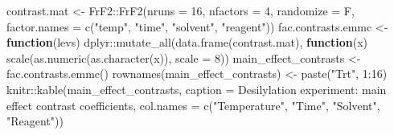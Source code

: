 \documentclass[
]{book}
\newenvironment{Shaded}{\begin{snugshade}}{\end{snugshade}}
\newcommand{\AttributeTok}[1]{\textcolor[rgb]{0.77,0.63,0.00}{#1}}
\newcommand{\ControlFlowTok}[1]{\textcolor[rgb]{0.13,0.29,0.53}{\textbf{#1}}}
\newcommand{\DecValTok}[1]{\textcolor[rgb]{0.00,0.00,0.81}{#1}}
\newcommand{\FunctionTok}[1]{\textcolor[rgb]{0.00,0.00,0.00}{#1}}
\newcommand{\NormalTok}[1]{#1}
\newcommand{\OtherTok}[1]{\textcolor[rgb]{0.56,0.35,0.01}{#1}}
\newcommand{\SpecialCharTok}[1]{\textcolor[rgb]{0.00,0.00,0.00}{#1}}
\newcommand{\StringTok}[1]{\textcolor[rgb]{0.31,0.60,0.02}{#1}}
\theoremstyle{definition}
\theoremstyle{definition}
\theoremstyle{definition}
\theoremstyle{definition}
\theoremstyle{remark}
\begin{document}
\begin{Shaded}
\begin{Highlighting}[]
\NormalTok{contrast.mat }\OtherTok{\textless{}{-}}\NormalTok{ FrF2}\SpecialCharTok{::}\FunctionTok{FrF2}\NormalTok{(}\AttributeTok{nruns =} \DecValTok{16}\NormalTok{, }\AttributeTok{nfactors =} \DecValTok{4}\NormalTok{, }\AttributeTok{randomize =}\NormalTok{ F, }
                           \AttributeTok{factor.names =} \FunctionTok{c}\NormalTok{(}\StringTok{"temp"}\NormalTok{, }\StringTok{"time"}\NormalTok{, }\StringTok{"solvent"}\NormalTok{, }\StringTok{"reagent"}\NormalTok{))}
\NormalTok{fac.contrasts.emmc }\OtherTok{\textless{}{-}} \ControlFlowTok{function}\NormalTok{(levs) }
\NormalTok{  dplyr}\SpecialCharTok{::}\FunctionTok{mutate\_all}\NormalTok{(}\FunctionTok{data.frame}\NormalTok{(contrast.mat), }\ControlFlowTok{function}\NormalTok{(x) }\FunctionTok{scale}\NormalTok{(}\FunctionTok{as.numeric}\NormalTok{(}\FunctionTok{as.character}\NormalTok{(x)), }\AttributeTok{scale =} \DecValTok{8}\NormalTok{))}
\NormalTok{main\_effect\_contrasts }\OtherTok{\textless{}{-}} \FunctionTok{fac.contrasts.emmc}\NormalTok{()}
\FunctionTok{rownames}\NormalTok{(main\_effect\_contrasts) }\OtherTok{\textless{}{-}} \FunctionTok{paste}\NormalTok{(}\StringTok{"Trt"}\NormalTok{, }\DecValTok{1}\SpecialCharTok{:}\DecValTok{16}\NormalTok{)}
\NormalTok{knitr}\SpecialCharTok{::}\FunctionTok{kable}\NormalTok{(main\_effect\_contrasts, }\AttributeTok{caption =} \StringTok{\textquotesingle{}Desilylation experiment: main effect contrast coefficients\textquotesingle{}}\NormalTok{, }\AttributeTok{col.names =} \FunctionTok{c}\NormalTok{(}\StringTok{"Temperature"}\NormalTok{, }\StringTok{"Time"}\NormalTok{, }\StringTok{"Solvent"}\NormalTok{, }\StringTok{"Reagent"}\NormalTok{))}
\end{Highlighting}
\end{Shaded}
\end{document}
